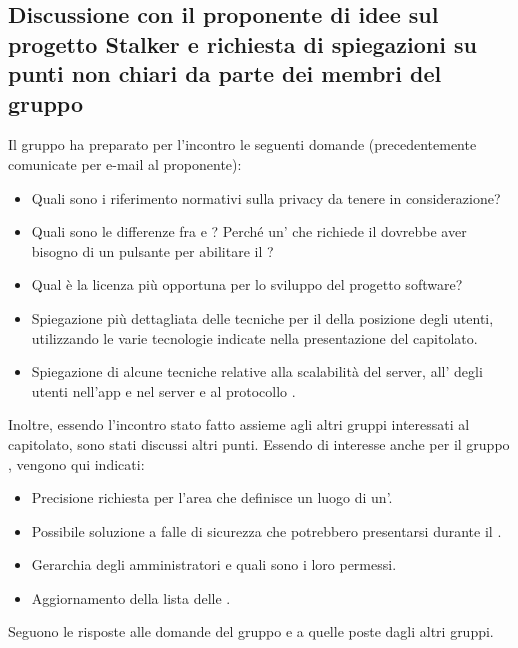 \subsection{Discussione con il proponente di idee sul progetto Stalker e richiesta di spiegazioni su punti non chiari da parte dei membri del gruppo}
Il gruppo ha preparato per l'incontro le seguenti domande (precedentemente comunicate per e-mail al proponente):
\begin{itemize}
	\item Quali sono i riferimento normativi sulla privacy da tenere in considerazione?
	\item Quali sono le differenze fra  e ? Perché un' che richiede il  dovrebbe aver bisogno di un pulsante per abilitare il ?
	\item Qual è la licenza più opportuna per lo sviluppo del progetto software?
	\item Spiegazione più dettagliata delle tecniche per il  della posizione degli utenti, utilizzando le varie tecnologie indicate nella presentazione del capitolato.
	\item Spiegazione di alcune tecniche relative alla scalabilità del server, all' degli utenti nell'app e nel server e al protocollo .
\end{itemize}
Inoltre, essendo l'incontro stato fatto assieme agli altri gruppi interessati al capitolato, sono stati discussi altri punti. Essendo di interesse anche per il gruppo \Gruppo{}, vengono qui indicati:
\begin{itemize}
	\item Precisione richiesta per l'area che definisce un luogo di un'.
	\item Possibile soluzione a falle di sicurezza che potrebbero presentarsi durante il .
	\item Gerarchia degli amministratori e quali sono i loro permessi.
	\item Aggiornamento della lista delle .
\end{itemize}
Seguono le risposte alle domande del gruppo e a quelle poste dagli altri gruppi.

